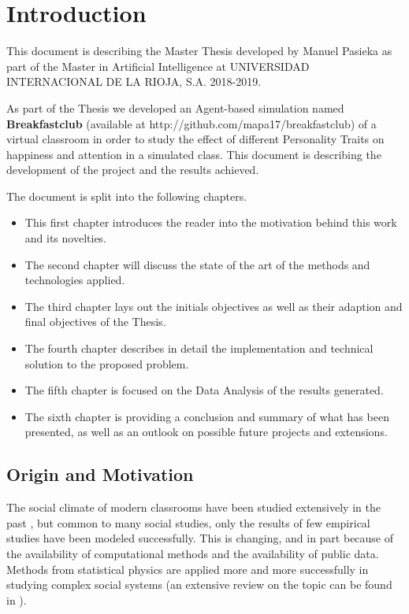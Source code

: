 \chapter{Introduction}
This document is describing the Master Thesis developed by Manuel Pasieka as part
of the Master in Artificial Intelligence at UNIVERSIDAD INTERNACIONAL DE LA RIOJA, S.A.
2018-2019. \par

\bb

As part of the Thesis we developed an Agent-based simulation named
\textbf{Breakfastclub} (available at http://github.com/mapa17/breakfastclub) of
a virtual classroom in order to study the effect of different Personality Traits
on happiness and attention in a simulated class. This document is describing the
development of the project and the results achieved.

\bb

The document is split into the following chapters.
\begin{itemize}
\item This first chapter introduces the reader into the motivation behind this work and
its novelties.
\item The second chapter will discuss the state of the art of the methods and technologies
applied.
\item The third chapter lays out the initials objectives as well as their adaption
and final objectives of the Thesis.
\item The fourth chapter describes in detail the implementation and technical solution
to the proposed problem.
\item The fifth chapter is focused on the Data Analysis of the results generated.
\item The sixth chapter is providing a conclusion and summary of what has been
presented, as well as an outlook on possible future projects and extensions.
\end{itemize}

\section{Origin and Motivation}
The social climate of modern classrooms have been studied extensively in the past \cite{Anderson1982},
but common to many social studies, only the results of few empirical studies have been modeled
successfully. This is changing, and in part because of the availability of
computational methods and the availability of public data. Methods from statistical
physics are applied more and more successfully in studying complex social systems
(an extensive review on the topic can be found in \cite{Castellano2007}).

